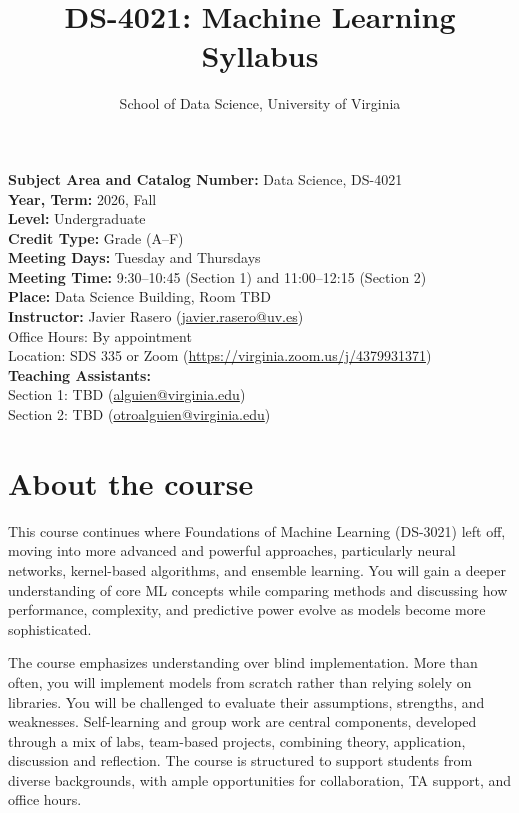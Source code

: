 \documentclass[12pt]{article}
\title{DS-4021: Machine Learning \\ \vspace{0.3cm} \large Syllabus}
\author{School of Data Science, University of Virginia}
\date{}
\begin{document}
\maketitle

\noindent
\textbf{Subject Area and Catalog Number:} Data Science, DS-4021 \\[4pt]
\textbf{Year, Term:} 2026, Fall \\[4pt]
\textbf{Level:} Undergraduate \\[4pt]
\textbf{Credit Type:} Grade (A--F) \\[4pt]
\textbf{Meeting Days:} Tuesday and Thursdays \\[4pt]
\textbf{Meeting Time:} 9:30--10:45 (Section 1) and 11:00--12:15 (Section 2) \\[4pt]
\textbf{Place:} Data Science Building, Room TBD \\[6pt]

\noindent
\textbf{Instructor:} Javier Rasero (\href{mailto:javier.rasero@uv.es}{javier.rasero@uv.es}) \\[2pt]
Office Hours: By appointment \\[2pt]
Location: SDS 335 or Zoom (\href{https://virginia.zoom.us/j/4379931371}{https://virginia.zoom.us/j/4379931371}) \\[8pt]

\noindent
\textbf{Teaching Assistants:} \\[2pt]
Section 1: TBD (\href{mailto:alguien@virginia.edu}{alguien@virginia.edu}) \\[2pt]
Section 2: TBD (\href{mailto:otroalguien@virginia.edu}{otroalguien@virginia.edu}) 

\section*{About the course}

This course continues where Foundations of Machine Learning (DS-3021) left off, moving into more advanced and powerful approaches, particularly neural networks, kernel-based algorithms, and ensemble learning. You will gain a deeper understanding of core ML concepts while comparing methods and discussing how performance, complexity, and predictive power evolve as models become more sophisticated.

The course emphasizes understanding over blind implementation. More than often, you will implement models from scratch rather than relying solely on libraries. You will be challenged to evaluate their assumptions, strengths, and weaknesses. Self-learning and group work are central components, developed through a mix of labs, team-based projects, combining theory, application, discussion and reflection. The course is structured to support students from diverse backgrounds, with ample opportunities for collaboration, TA support, and office hours.
\end{document}
